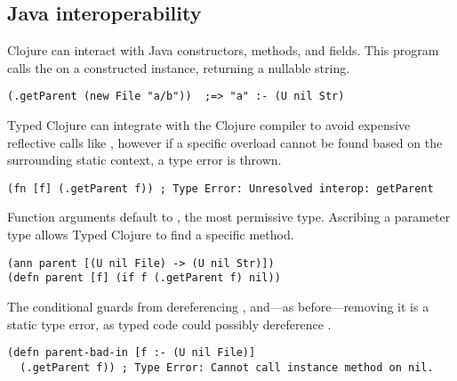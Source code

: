 \subsection{Java interoperability}
\label{sec:overviewjavainterop}

Clojure can interact with Java constructors, methods, and fields.
This program calls the  on a constructed
instance, returning a nullable string.

\begin{exmp}
\begin{verbatim}
(.getParent (new File "a/b"))  ;=> "a" :- (U nil Str)
\end{verbatim}
\label{example:getparent-direct-constructor}
\end{exmp}
%
Typed Clojure can integrate with the Clojure compiler to avoid expensive reflective 
calls like , however if a specific overload cannot be found based on the
surrounding static context, a type error is thrown.
%
\begin{verbatim}
(fn [f] (.getParent f)) ; Type Error: Unresolved interop: getParent
\end{verbatim}
%
Function arguments default to , the most permissive type. Ascribing
a parameter type allows Typed Clojure to find a specific method.


\begin{exmp}
\begin{verbatim}
(ann parent [(U nil File) -> (U nil Str)])
(defn parent [f] (if f (.getParent f) nil))
\end{verbatim}
\label{example:parent-if}
\end{exmp}


The conditional guards from dereferencing , and---as before---removing 
it is a static type error, as typed code could possibly dereference .
\begin{verbatim}
(defn parent-bad-in [f :- (U nil File)]
  (.getParent f)) ; Type Error: Cannot call instance method on nil.
\end{verbatim}

